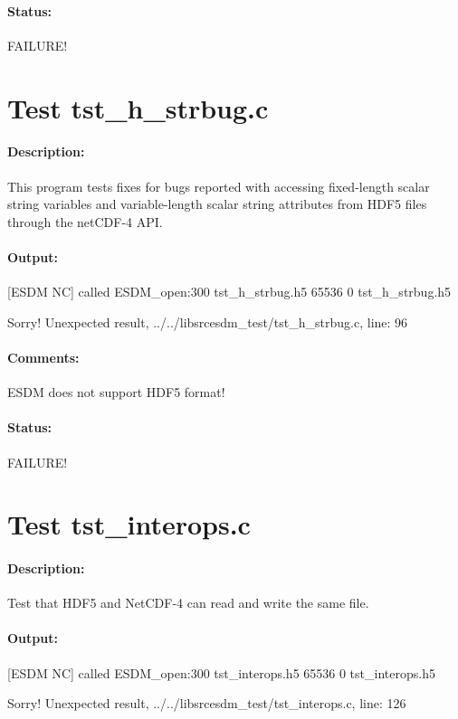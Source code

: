 \paragraph{Status:} FAILURE!

\section{Test tst\_h\_strbug.c}

\paragraph{Description:} This program tests fixes for bugs reported with accessing fixed-length scalar string variables and variable-length scalar string attributes from HDF5 files through the netCDF-4 API.

\paragraph{Output:} [ESDM NC] called ESDM\_open:300 tst\_h\_strbug.h5 65536 0 tst\_h\_strbug.h5

Sorry! Unexpected result, ../../libsrcesdm\_test/tst\_h\_strbug.c, line: 96

\paragraph{Comments:} ESDM does not support HDF5 format!

\paragraph{Status:} FAILURE!

\section{Test tst\_interops.c}

\paragraph{Description:} Test that HDF5 and NetCDF-4 can read and write the same file.

\paragraph{Output:} [ESDM NC] called ESDM\_open:300 tst\_interops.h5 65536 0 tst\_interops.h5

Sorry! Unexpected result, ../../libsrcesdm\_test/tst\_interops.c, line: 126

